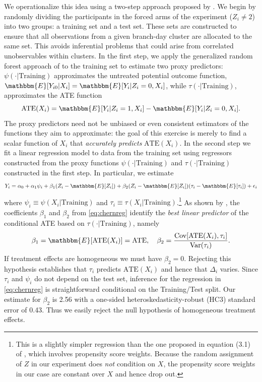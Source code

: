 We operationalize this idea using a two-step approach proposed by \cite{chernozhukov2018generic}.  We begin by randomly dividing the participants in the forced arms of the experiment ($Z_i \neq 2$) into two groups: a training set and a test set.
These sets are constructed to ensure that all observations from a given branch-day cluster are allocated to the same set.
This avoids inferential problems that could arise from correlated unobservables within clusters.
In the first step, we apply the generalized random forest approach of \cite{atheygrf} to the training set to estimate two proxy predictors: $\psi(\cdot|\text{Training})$ approximates the untreated potential outcome function, $\mathbbm{E}[Y_{i0}|X_i] = \mathbbm{E}[Y_i|Z_i=0,X_i]$, while  $\tau(\cdot|\text{Training})$, approximates the ATE function
\[
\text{ATE}(X_i) = \mathbbm{E}[Y_i|Z_i=1,X_i] - \mathbbm{E}[Y_i|Z_i=0, X_i].
\]
The proxy predictors need not be unbiased or even consistent estimators of the functions they aim to approximate: the goal of this exercise is merely to find a scalar function of $X_i$ that \emph{accurately predicts} $\text{ATE}(X_i)$.
In the second step we fit a linear regression model to data from the training set using regressors constructed from the proxy functions $\psi(\cdot|\text{Training})$ and $\tau(\cdot|\text{Training})$ constructed in the first step. In particular, we estimate 
\begin{equation}
Y_i = \alpha_0 + \alpha_1 \psi_i + \beta_1 (Z_i - \mathbbm{E}[Z_i]) + \beta_2 (Z_i - \mathbbm{E}[Z_i])(\tau_i - \mathbbm{E}[\tau_i]) + \epsilon_i
\label{eq:chernreg}
\end{equation}
where $\psi_i \equiv \psi(X_i|\text{Training})$ and $\tau_i \equiv \tau(X_i|\text{Training})$.\footnote{This is a slightly simpler regression than the one proposed in equation (3.1) of \cite{chernozhukov2018generic}, which involves propensity score weights. Because the random assignment of $Z$ in our experiment does \emph{not} condition on $X$, the propensity score weights in our case are constant over $X$ and hence drop out.} As shown by \cite{chernozhukov2018generic}, the coefficients $\beta_1$ and $\beta_2$ from \eqref{eq:chernreg} identify the \emph{best linear predictor} of the conditional ATE based on $\tau(\cdot|\text{Training})$, namely
\[
\beta_1 = \mathbbm{E}[\text{ATE}(X_i)] = \text{ATE}, \quad
\beta_2 = \frac{\text{Cov}[\text{ATE}(X_i), \tau_i]}{\text{Var}(\tau_i)}.
\]
If treatment effects are homogeneous we must have $\beta_2 = 0$. Rejecting this hypothesis establishes that $\tau_i$ predicts $\text{ATE}(X_i)$ and hence that $\Delta_i$ varies. 
Since $\tau_i$ and $\psi_i$ do not depend on the test set, inference for the regression in \eqref{eq:chernreg} is straightforward conditional on the Training/Test split.  
Our estimate for $\beta_2$ is 2.56 with a one-sided heteroskedasticity-robust (HC3) standard error of 0.43.
Thus we easily reject the null hypothesis of homogeneous treatment effects.

